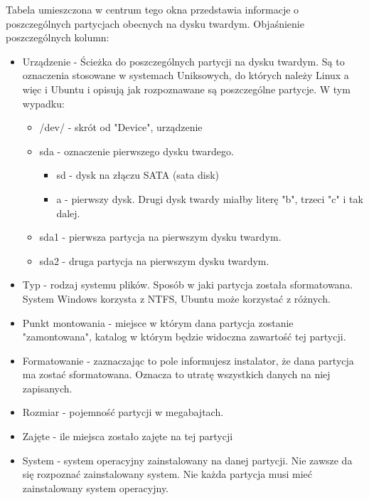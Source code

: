 Tabela umieszczona w centrum tego okna przedstawia informacje o poszczególnych partycjach obecnych na dysku twardym. Objaśnienie poszczególnych kolumn:
\begin{itemize}
\item \textcolor{ubuntu_orange}{Urządzenie} - Ścieżka do poszczególnych partycji na dysku twardym. Są to oznaczenia stosowane w systemach Uniksowych, do których należy Linux a więc i Ubuntu i opisują jak rozpoznawane są poszczególne partycje. W tym wypadku:
        \begin{itemize}
        \item \textcolor{ubuntu_orange}{/dev/} - skrót od "Device", urządzenie
        \item \textcolor{ubuntu_orange}{sda} - oznaczenie pierwszego dysku twardego.
                \begin{itemize}
                        \item \textcolor{ubuntu_orange}{sd} - dysk na złączu SATA (sata disk)
                        \item \textcolor{ubuntu_orange}{a} - pierwszy dysk. Drugi dysk twardy miałby literę "b", trzeci "c" i tak dalej.
                \end{itemize}
        \item \textcolor{ubuntu_orange}{sda1} - pierwsza partycja na pierwszym dysku twardym.
        \item \textcolor{ubuntu_orange}{sda2} - druga partycja na pierwszym dysku twardym.
        \end{itemize}
\item \textcolor{ubuntu_orange}{Typ} - rodzaj systemu plików. Sposób w jaki partycja została sformatowana. System Windows korzysta z NTFS, Ubuntu może korzystać z różnych.
\item \textcolor{ubuntu_orange}{Punkt montowania} - miejsce w którym dana partycja zostanie "zamontowana", katalog w którym będzie widoczna zawartość tej partycji.
\item \textcolor{ubuntu_orange}{Formatowanie} - zaznaczając to pole informujesz instalator, że dana partycja ma zostać sformatowana. Oznacza to utratę wszystkich danych na niej zapisanych.
\item \textcolor{ubuntu_orange}{Rozmiar} - pojemność partycji w megabajtach.
\item \textcolor{ubuntu_orange}{Zajęte} - ile miejsca zostało zajęte na tej partycji
\item \textcolor{ubuntu_orange}{System} - system operacyjny zainstalowany na danej partycji. Nie zawsze da się rozpoznać zainstalowany system. Nie każda partycja musi mieć zainstalowany system operacyjny. 
\end{itemize}
\clearpage
